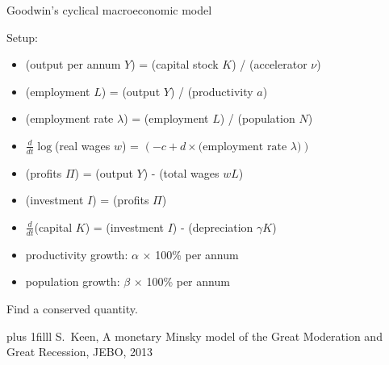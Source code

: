 \documentclass[onepage, 12pt]{beamer}
\def\Bottom#1{\vskip 0pt plus 1filll #1}
\begin{document}
%

\begin{frame}[t]{Goodwin's cyclical macroeconomic model}{}

    Setup:
    \begin{itemize}
    \item 
        (output per annum $Y$) = (capital stock $K$) / (accelerator $\nu$)
    \item
        (employment $L$) = (output $Y$) / (productivity $a$)
    \item
        (employment rate $\lambda$) = (employment $L$) / (population $N$)
    \item
        $\frac{d}{dt} \log$(real wages $w$)
        =
        $(-c + d \times \text{(employment rate $\lambda$)})$
    \item
        (profits $\Pi$) = (output $Y$) - (total wages $w L$)
    \item
        (investment $I$) = (profits $\Pi$)
    \item
        $\frac{d}{dt}$(capital $K$)
        =
        (investment $I$) - (depreciation $\gamma K$)
    \item
        productivity growth: $\alpha$ $\times$ 100\% per annum
    \item
        population growth: $\beta$ $\times$ 100\% per annum
    \end{itemize}
    
    Find a conserved quantity.
    
    \Bottom{%
        \footnotesize
        S.~Keen,
        A monetary Minsky model of the Great Moderation and Great Recession, 
        JEBO, 2013
    }
\end{frame}

%
\end{document}
